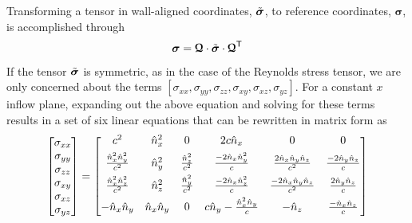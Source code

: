 \begin{itemize}[parsep=2.5\parsep]
    Transforming a tensor in wall-aligned coordinates, \(\tilde{\bm{\sigma}}\), to
    reference coordinates, \(\bm{\sigma}\), is accomplished through
    \begin{equation*}
      \bm{\sigma} = \bm{\mathcal{Q}} \cdot \tilde{\bm{\sigma}} \cdot \bm{\mathcal{Q}}^{\mathsf{T}}
    \end{equation*}
    If the tensor \(\tilde{\bm{\sigma}}\) is symmetric, as in the case of the
    Reynolds stress tensor, we are only concerned about the terms
    \([\sigma_{xx}, \sigma_{yy}, \sigma_{zz}, \sigma_{xy}, \sigma_{xz},
    \sigma_{yz}]\).
    For a constant $x$ inflow plane,
    expanding out the above equation and solving for these terms results in a
    set of six linear equations that can be rewritten in matrix form as
    \begin{equation*}
      \begin{bmatrix}
        \sigma_{xx}\\ \sigma_{yy}\\ \sigma_{zz}\\
        \sigma_{xy}\\ \sigma_{xz}\\ \sigma_{yz}
      \end{bmatrix} =
      \begin{bmatrix}
        c^2 & \hat{n}_x^2 & 0 & 2c\hat{n}_x & 0 & 0 \\[1.0ex]
        \frac{\hat{n}_x^2\hat{n}_y^2}{c^2} &
        \hat{n}_y^2 &
        \frac{\hat{n}_z^2}{c^2} &
        \frac{-2\hat{n}_x\hat{n}_y^2}{c} &
        \frac{2\hat{n}_x\hat{n}_y\hat{n}_z}{c^2} &
        \frac{-2\hat{n}_y\hat{n}_z}{c} \\[1.0ex]
        \frac{\hat{n}_x^2\hat{n}_z^2}{c^2} &
        \hat{n}_z^2 &
        \frac{\hat{n}_y^2}{c^2} &
        \frac{-2\hat{n}_x\hat{n}_z^2}{c} &
        \frac{-2\hat{n}_x\hat{n}_y\hat{n}_z}{c^2} &
        \frac{2\hat{n}_y\hat{n}_z}{c} \\[1.0ex]
        -\hat{n}_x\hat{n}_y &
        \hat{n}_x\hat{n}_y &
        0 &
        c\hat{n}_y-\frac{\hat{n}_x^2\hat{n}_y}{c} &
        -\hat{n}_z &
        \frac{-\hat{n}_x\hat{n}_z}{c} \\[1.0ex]

\end{bmatrix}
\end{equation*}
\end{itemize}
